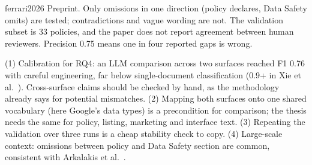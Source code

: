 \begin{papercard}{ferrari2026}
 Preprint. Only omissions in one direction (policy declares, Data Safety omits) are tested; contradictions and vague wording are not. The validation subset is 33 policies, and the paper does not report agreement between human reviewers. Precision 0.75 means one in four reported gaps is wrong.

 (1) Calibration for RQ4: an LLM comparison across two surfaces reached F1 0.76 with careful engineering, far below single-document classification (0.9+ in Xie et al.\ ). Cross-surface claims should be checked by hand, as the methodology already says for potential mismatches. (2) Mapping both surfaces onto one shared vocabulary (here Google's data types) is a precondition for comparison; the thesis needs the same for policy, listing, marketing and interface text. (3) Repeating the validation over three runs is a cheap stability check to copy. (4) Large-scale context: omissions between policy and Data Safety section are common, consistent with Arkalakis et al.\ .
\end{papercard}
